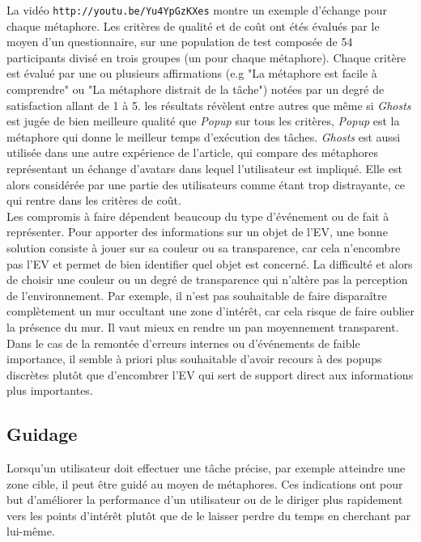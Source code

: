 \documentclass[11pt]{article}
\begin{document}
La vidéo \texttt{http://youtu.be/Yu4YpGzKXes} montre un exemple d'échange pour chaque métaphore. Les critères de qualité et de coût ont étés évalués par le moyen d'un questionnaire, sur une population de test composée de 54 participants divisé en trois groupes (un pour chaque métaphore). Chaque critère est évalué par une ou plusieurs affirmations (e.g "La métaphore est facile à comprendre" ou "La métaphore distrait de la tâche") notées par un degré de satisfaction allant de 1 à 5. les résultats révèlent entre autres que même si \textit{Ghosts} est jugée de bien meilleure qualité que \textit{Popup} sur tous les critères, \textit{Popup} est la métaphore qui donne le meilleur temps d'exécution des tâches. \textit{Ghosts} est aussi utilisée dans une autre expérience de l'article, qui compare des métaphores représentant un échange d'avatars dans lequel l'utilisateur est impliqué. Elle est alors considérée par une partie des utilisateurs comme étant trop distrayante, ce qui rentre dans les critères de coût.
\\

Les compromis à faire dépendent beaucoup du type d'événement ou de fait à représenter. Pour apporter des informations sur un objet de l'EV, une bonne solution consiste à jouer sur sa couleur ou sa transparence, car cela n'encombre pas l'EV et permet de bien identifier quel objet est concerné. La difficulté et alors de choisir une couleur ou un degré de transparence qui n'altère pas la perception de l'environnement. Par exemple, il n'est pas souhaitable de faire disparaître complètement un mur occultant une zone d'intérêt, car cela risque de faire oublier la présence du mur. Il vaut mieux en rendre un pan moyennement transparent. Dans le cas de la remontée d'erreurs internes ou d'événements de faible importance, il semble à priori plus souhaitable d'avoir recours à des popups discrètes plutôt que d'encombrer l'EV qui sert de support direct aux informations plus importantes.

\subsection{Guidage}
\label{subsec:facilitation}
Lorsqu'un utilisateur doit effectuer une tâche précise, par exemple atteindre une zone cible, il peut être guidé au moyen de métaphores. Ces indications ont pour but d'améliorer la performance d'un utilisateur ou de le diriger plus rapidement vers les points d'intérêt plutôt que de le laisser perdre du temps en cherchant par lui-même.
\\
\end{document}
